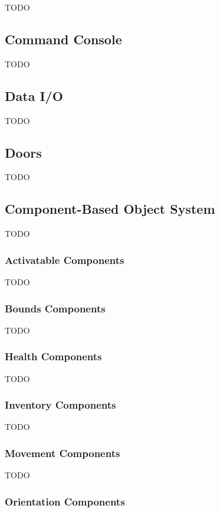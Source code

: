 TODO

\subsection{Command Console}

TODO

\subsection{Data I/O}

TODO

\subsection{Doors}

TODO

\subsection{Component-Based Object System}

TODO

\subsubsection{Activatable Components}

TODO

\subsubsection{Bounds Components}

TODO

\subsubsection{Health Components}

TODO

\subsubsection{Inventory Components}

TODO

\subsubsection{Movement Components}

TODO

\subsubsection{Orientation Components}

